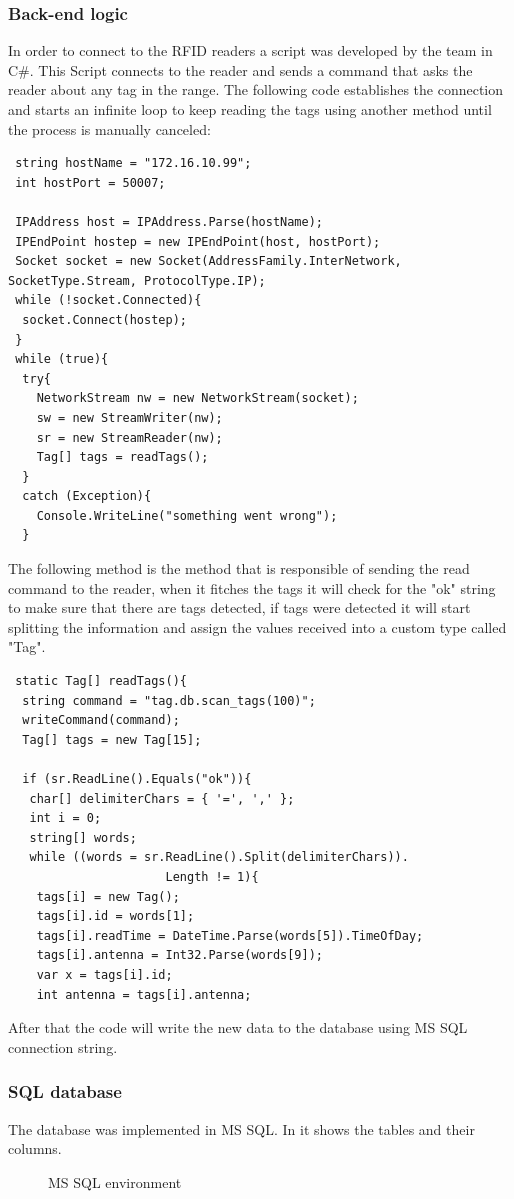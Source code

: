 \documentclass[a4paper,twoside]{IEEEtran}
\begin{document}
\subsubsection{Back-end logic}
In order to connect to the RFID readers a script was developed by the team in C\#. This Script connects to the reader and sends a command that asks the reader about any tag in the range. The following code establishes the connection and starts an infinite loop to keep reading the tags using another method until the process is manually canceled:
\lstset{style=sharpc}
\begin{lstlisting}
 string hostName = "172.16.10.99";
 int hostPort = 50007;

 IPAddress host = IPAddress.Parse(hostName);
 IPEndPoint hostep = new IPEndPoint(host, hostPort);
 Socket socket = new Socket(AddressFamily.InterNetwork, SocketType.Stream, ProtocolType.IP);
 while (!socket.Connected){
  socket.Connect(hostep);
 }
 while (true){
  try{
    NetworkStream nw = new NetworkStream(socket);
    sw = new StreamWriter(nw);
    sr = new StreamReader(nw);
    Tag[] tags = readTags();
  }
  catch (Exception){
    Console.WriteLine("something went wrong");
  }
\end{lstlisting}
The following method is the method that is responsible of sending the read command to the reader, when it fitches the tags it will check for the "ok" string to make sure that there are tags detected, if tags were detected it will start splitting the information and assign the values received into a custom type called "Tag".
\lstset{style=sharpc}
\begin{lstlisting}
 static Tag[] readTags(){ 
  string command = "tag.db.scan_tags(100)";
  writeCommand(command);
  Tag[] tags = new Tag[15];

  if (sr.ReadLine().Equals("ok")){
   char[] delimiterChars = { '=', ',' };
   int i = 0;
   string[] words;
   while ((words = sr.ReadLine().Split(delimiterChars)).
                      Length != 1){
    tags[i] = new Tag();
    tags[i].id = words[1];
    tags[i].readTime = DateTime.Parse(words[5]).TimeOfDay;
    tags[i].antenna = Int32.Parse(words[9]);
    var x = tags[i].id;
    int antenna = tags[i].antenna;
\end{lstlisting}
After that the code will write the new data to the database using MS SQL connection string.

\subsubsection{SQL database} The database was implemented in MS SQL. In  it shows the tables and their columns.\\
\begin{figure}[ht]
\centering
{}
\caption{MS SQL environment}
\label{sql}
\end{figure}
\end{document}
